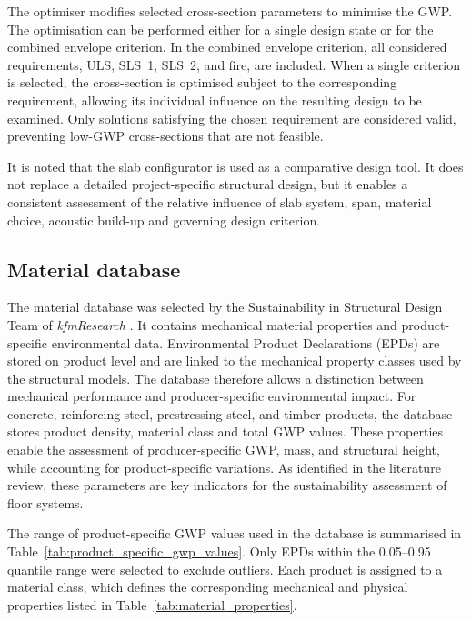 \newpage


The optimiser modifies selected cross-section parameters to minimise the GWP. The optimisation can be performed either for a single design state or for the combined envelope criterion. In the combined envelope criterion, all considered requirements, ULS, SLS~1, SLS~2, and fire, are included. When a single criterion is selected, the cross-section is optimised subject to the corresponding requirement, allowing its individual influence on the resulting design to be examined. Only solutions satisfying the chosen requirement are considered valid, preventing low-GWP cross-sections that are not feasible.

It is noted that the slab configurator is used as a comparative design tool. It does not replace a detailed project-specific structural design, but it enables a consistent assessment of the relative influence of slab system, span, material choice, acoustic build-up and governing design criterion.


\subsection{Material database}
The material database was selected by the Sustainability in Structural Design Team of \textit{kfmResearch} \cite{kfmResearch2026}. It contains mechanical material properties and product-specific environmental data. Environmental Product Declarations (EPDs) are stored on product level and are linked to the mechanical property classes used by the structural models. The database therefore allows a distinction between mechanical performance and producer-specific environmental impact. For concrete, reinforcing steel, prestressing steel, and timber products, the database stores product density, material class and total GWP values. These properties enable the assessment of producer-specific GWP, mass, and structural height, while accounting for product-specific variations. As identified in the literature review, these parameters are key indicators for the sustainability assessment of floor systems.

The range of product-specific GWP values used in the database is summarised in Table~\ref{tab:product_specific_gwp_values}. Only EPDs within the 0.05--0.95 quantile range were selected to exclude outliers. Each product is assigned to a material class, which defines the corresponding mechanical and physical properties listed in Table~\ref{tab:material_properties}.



